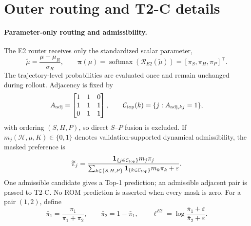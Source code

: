 \section{Outer routing and T2-C details}
\label{app:routing}

\paragraph{Parameter-only routing and admissibility.}
The E2 router receives only the standardized scalar parameter,
\begin{equation}
 \widetilde\mu=\frac{\mu-\mu_R}{\sigma_R},\qquad
 \bm\pi(\mu)=\operatorname{softmax}(\mathcal R_{E2}(\widetilde\mu))
 =[\pi_S,\pi_H,\pi_P]^\top.
 \label{eq:app_e2_parameter_only}
\end{equation}
The trajectory-level probabilities are evaluated once and remain unchanged
during rollout. Adjacency is fixed by
\begin{equation}
 A_{\rm adj}=\begin{bmatrix}1&1&0\\1&1&1\\0&1&1\end{bmatrix},
 \qquad
 \mathcal C_{\rm top}(k)=\{j:A_{{\rm adj},kj}=1\},
 \label{eq:app_adjacency}
\end{equation}
with ordering $(S,H,P)$, so direct $S$--$P$ fusion is excluded. If
$m_j(\mathcal H,\mu,K)\in\{0,1\}$ denotes validation-supported dynamical
admissibility, the masked preference is
\begin{equation}
 \widetilde\pi_j=
 \frac{\mathbf 1_{\{j\in\mathcal C_{\rm top}\}}m_j\pi_j}
 {\sum_{k\in\{S,H,P\}}\mathbf 1_{\{k\in\mathcal C_{\rm top}\}}m_k\pi_k+\varepsilon}.
 \label{eq:app_masked_e2}
\end{equation}
One admissible candidate gives a Top-1 prediction; an admissible adjacent pair
is passed to T2-C. No ROM prediction is asserted when every mask is zero.
For a pair $(1,2)$, define
\begin{equation}
 \bar\pi_1=\frac{\pi_1}{\pi_1+\pi_2},\qquad
 \bar\pi_2=1-\bar\pi_1,\qquad
 \ell^{E2}=\log\frac{\bar\pi_1+\varepsilon}{\bar\pi_2+\varepsilon}.
 \label{eq:app_pair_logit}
\end{equation}

